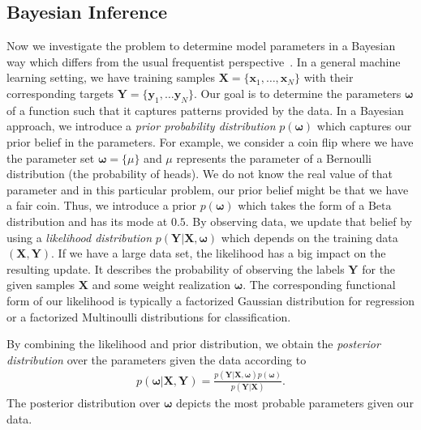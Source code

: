 \documentclass[runningheads]{llncs}
\begin{document}
\subsection{Bayesian Inference}
\label{sec:bayesian_inference}
Now we investigate the problem to determine model parameters in a Bayesian way which differs from the usual frequentist perspective~\cite{bishop:2006:PRML}.
In a general machine learning setting, we have training samples $\mathbf{X} = \{\mathbf{x}_1, \dots,  \mathbf{x}_N\}$ with their corresponding targets $\mathbf{Y} = \{\mathbf{y}_1, \dots  \mathbf{y}_N\}$. 
Our goal is to determine the parameters $\boldsymbol{\omega}$ of a function such that it captures patterns provided by the data.
In a Bayesian approach, we introduce a \textit{prior probability distribution} $p(\boldsymbol{\omega})$ which captures our prior belief in the parameters.
For example, we consider a coin flip where we have the parameter set $\boldsymbol{\omega} = \{\mu\}$ and $\mu$ represents the parameter of a Bernoulli distribution (the probability of heads).
We do not know the real value of that parameter and in this particular problem, our prior belief might be that we have a fair coin. 
Thus, we introduce a prior $p(\boldsymbol{\omega})$ which takes the form of a $\mathrm{Beta}$ distribution and has its mode at $0.5$.
By observing data, we update that belief by using a \textit{likelihood distribution} $p\left(\mathbf{Y} | \mathbf{X}, \boldsymbol{\omega} \right)$ which depends on the training data $\left(\mathbf{X}, \mathbf{Y}\right)$. 
If we have a large data set, the likelihood has a big impact on the resulting update.
It describes the probability of observing the labels $\mathbf{Y}$ for the given samples $\mathbf{X}$ and some weight realization $\boldsymbol{\omega}$. 
The corresponding functional form of our likelihood is typically a factorized Gaussian distribution for regression or a factorized Multinoulli distributions for classification.

By combining the likelihood and prior distribution, we obtain the \textit{posterior distribution} over the parameters given the data according to 
\begin{align}
    p\left(\boldsymbol{\omega} | \mathbf{X}, \mathbf{Y} \right) = \frac{p(\mathbf{Y} | \mathbf{X}, \boldsymbol{\omega})p\left(\boldsymbol{\omega}\right)}{p\left(\mathbf{Y} | \mathbf{X}\right)}.\label{eq:posterior}
\end{align}
The posterior distribution over $\boldsymbol{\omega}$ depicts the most probable parameters given our data.
\end{document}
